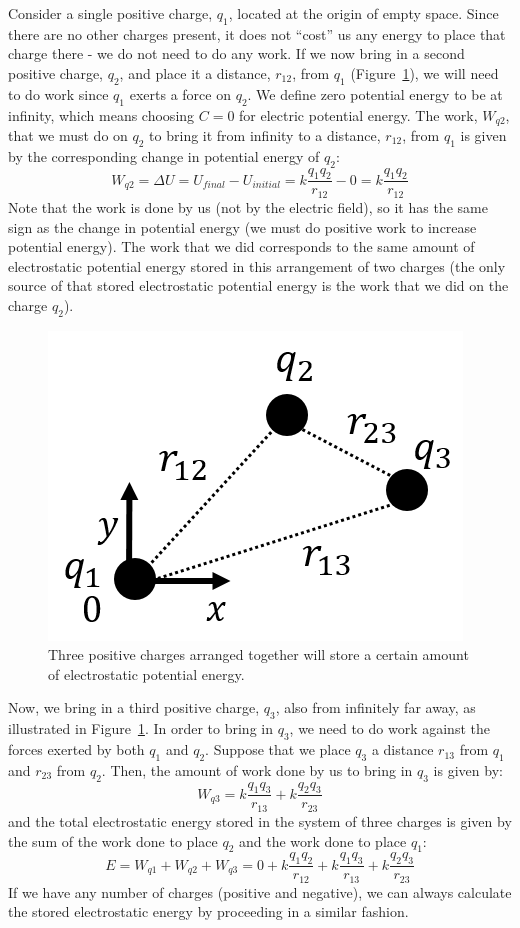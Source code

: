 Consider a single positive charge, $q_1$, located at the origin of empty space. Since there are no other charges present, it does not ``cost'' us any energy to place that charge there - we do not need to do any work. If we now bring in a second positive charge, $q_2$, and place it a distance, $r_{12}$, from $q_1$ (Figure~\ref{fig:potential:electrostaticenergy}), we will need to do work since $q_1$ exerts a force on $q_2$. We define zero potential energy to be at infinity, which means choosing $C=0$ for electric potential energy. The work, $W_{q2}$, that we must do on $q_2$ to bring it from infinity to a distance, $r_{12}$, from $q_1$ is given by the corresponding change in potential energy of $q_2$:
\begin{equation}
W_{q2}=\Delta U=U_{final}-U_{initial}=k\frac{q_1q_2}{r_{12}}-0=k\frac{q_1q_2}{r_{12}}
\end{equation}
Note that the work is done by us (not by the electric field), so it has the same sign as the change in potential energy (we must do positive work to increase potential energy). The work that we did corresponds to the same amount of electrostatic potential energy stored in this arrangement of two charges (the only source of that stored electrostatic potential energy is the work that we did on the charge $q_2$).

\begin{figure}[!htbp]
\centering
\includegraphics[width=0.3\linewidth]{files/electrostaticenergy-89ace4c8bca7c6e872fcfeae1c265bc3.png}
\caption[]{Three positive charges arranged together will store a certain amount of electrostatic potential energy.}
\label{fig:potential:electrostaticenergy}
\end{figure}

Now, we bring in a third positive charge, $q_3$, also from infinitely far away, as illustrated in Figure~\ref{fig:potential:electrostaticenergy}. In order to bring in $q_3$, we need to do work against the forces exerted by both $q_1$ and $q_2$. Suppose that we place $q_3$ a distance $r_{13}$ from $q_1$ and $r_{23}$ from $q_2$. Then, the amount of work done by us to bring in $q_3$ is given by:
\begin{equation}
W_{q3}=k\frac{q_1q_3}{r_{13}}+k\frac{q_2q_3}{r_{23}}
\end{equation}
and the total electrostatic energy stored in the system of three charges is given by the sum of the work done to place $q_2$ and the work done to place $q_1$:
\begin{equation}
E = W_{q1}+W_{q2}+W_{q3}=0+k\frac{q_1q_2}{r_{12}}+k\frac{q_1q_3}{r_{13}}+k\frac{q_2q_3}{r_{23}}
\end{equation}
If we have any number of charges (positive and negative), we can always calculate the stored electrostatic energy by proceeding in a similar fashion.

